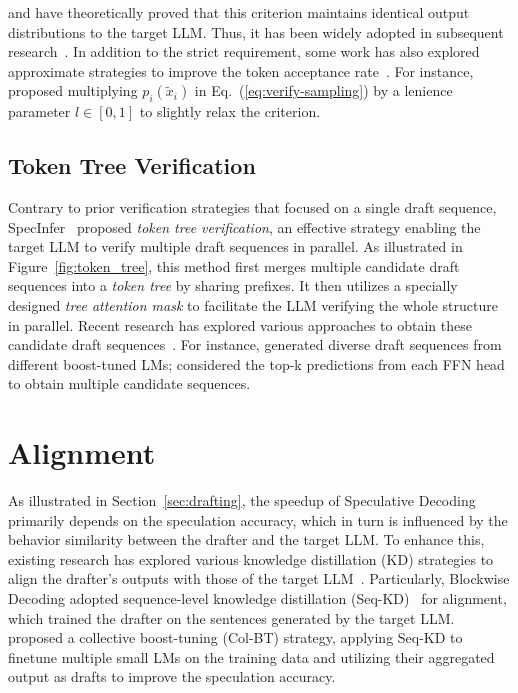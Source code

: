 \citet{Leviathan:2023specdec} and \citet{Chen:2023specsampling} have theoretically proved that this criterion maintains identical output distributions to the target LLM. Thus, it has been widely adopted in subsequent research~\cite{Liu:2023onlinespec, Zhou:2023distillspec, Monea:2023PaSS, chen2023cascadespec}. In addition to the strict requirement, some work has also explored approximate strategies to improve the token acceptance rate~\cite{Leviathan:2023specdec, Zhou:2023distillspec}. For instance, \citet{Leviathan:2023specdec} proposed multiplying $p_i(\widetilde{x}_i)$ in Eq.~(\ref{eq:verify-sampling}) by a lenience parameter $l \in [0,1]$ to slightly relax the criterion.

\subsection{Token Tree Verification}
\label{sec:token_tree_verification}
Contrary to prior verification strategies that focused on a single draft sequence, SpecInfer~\cite{Miao:2023specinfer} proposed \textit{token tree verification}, an effective strategy enabling the target LLM to verify multiple draft sequences in parallel. As illustrated in Figure~\ref{fig:token_tree}, this method first merges multiple candidate draft sequences into a \textit{token tree} by sharing prefixes. It then utilizes a specially designed \textit{tree attention mask} to facilitate the LLM verifying the whole structure in parallel. Recent research has explored various approaches to obtain these candidate draft sequences~\cite{Miao:2023specinfer, medusa, He:2023REST, Li:2024eagle}. For instance, \citet{Miao:2023specinfer} generated diverse draft sequences from different boost-tuned LMs; \citet{medusa} considered the top-k predictions from each FFN head to obtain multiple candidate sequences.

\section{Alignment}
\label{sec:alignment}
As illustrated in Section~\ref{sec:drafting}, the speedup of Speculative Decoding primarily depends on the speculation accuracy, which in turn is influenced by the behavior similarity between the drafter and the target LLM. To enhance this, existing research has explored various knowledge distillation (KD) strategies to align the drafter's outputs with those of the target LLM~\cite{Stern:2018blockwise, xia:2022specdec, Miao:2023specinfer, Liu:2023onlinespec, Kim:2023bild, Zhou:2023distillspec}. Particularly, Blockwise Decoding adopted sequence-level knowledge distillation (Seq-KD)~\cite{kim2016seqkd} for alignment, which trained the drafter on the sentences generated by the target LLM. \citet{Miao:2023specinfer} proposed a collective boost-tuning (Col-BT) strategy, applying Seq-KD to finetune multiple small LMs on the training data and utilizing their aggregated output as drafts to improve the speculation accuracy.


